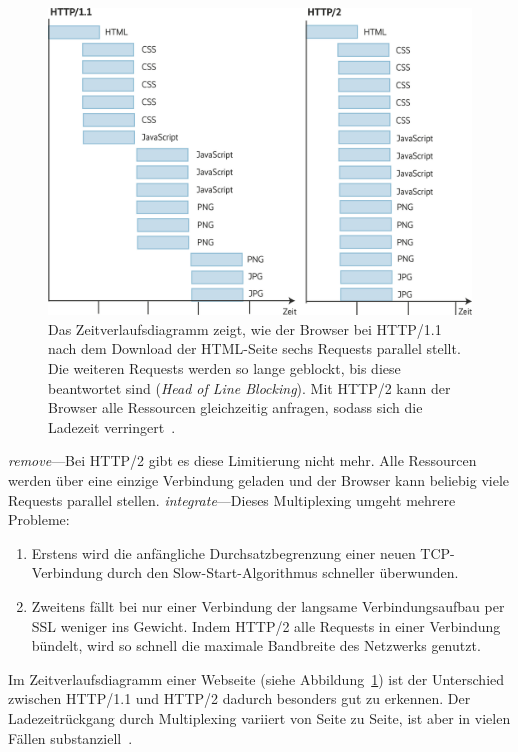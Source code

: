 \documentclass[a4paper, justified, notoc]{tufte-handout} %
\begin{document}
\begin{figure}%
	\centering
  \includegraphics[width=1\textwidth]{./figures/head_of_line_blocking.jpg}
  \caption{Das Zeitverlaufsdiagramm zeigt, wie der Browser bei HTTP/1.1 nach dem Download der HTML-Seite sechs Requests parallel stellt. Die weiteren Requests werden so lange geblockt, bis diese beantwortet sind (\emph{Head of Line Blocking}). Mit HTTP/2 kann der Browser alle Ressourcen gleichzeitig anfragen, sodass sich die Ladezeit verringert~\citep{heise:2018}.}
  \label{fig:head_of_line_blocking}
\end{figure}

\emph{remove}---Bei HTTP/2 gibt es diese Limitierung nicht mehr. Alle Ressourcen werden über eine einzige Verbindung geladen und der Browser kann beliebig viele Requests parallel stellen. 
\emph{integrate}---Dieses Multiplexing umgeht mehrere Probleme: 
\begin{enumerate}
	\item Erstens wird die anfängliche Durchsatzbegrenzung einer neuen TCP-Verbindung durch den Slow-Start-Algorithmus schneller überwunden.
	\item  Zweitens fällt bei nur einer Verbindung der langsame Verbindungsaufbau per SSL weniger ins Gewicht. Indem HTTP/2 alle Requests in einer Verbindung bündelt, wird so schnell die maximale Bandbreite des Netzwerks genutzt.
\end{enumerate}

Im Zeitverlaufsdiagramm einer Webseite (siehe Abbildung~\ref{fig:head_of_line_blocking}) ist der Unterschied zwischen HTTP/1.1 und HTTP/2 dadurch besonders gut zu erkennen. Der Ladezeitrückgang durch Multiplexing variiert von Seite zu Seite, ist aber in vielen Fällen substanziell~\citep{heise:2018}.
\end{document}
